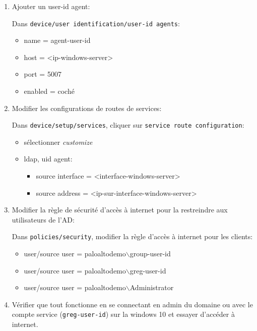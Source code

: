 \documentclass[a4paper]{article}
\begin{document}
\begin{enumerate}
    \item Ajouter un user-id agent:
    \begin{example}
        Dans \texttt{device/user identification/user-id agents}:
        \begin{itemize}
            \item name = agent-user-id
            \item host = <ip-windows-server>
            \item port = 5007
            \item enabled = coché
        \end{itemize}
    \end{example}
    \item Modifier les configurations de routes de services:
    \begin{example}
        Dans \texttt{device/setup/services}, cliquer sur \texttt{service route configuration}:
        \begin{itemize}
            \item sélectionner \textit{customize}
            \item ldap, uid agent:
            \begin{itemize}
                \item source interface = <interface-windows-server>
                \item source address = <ip-sur-interface-windows-server>
            \end{itemize}
        \end{itemize}
    \end{example}
    \item Modifier la règle de sécurité d'accès à internet pour la restreindre aux utilisateurs de l'AD:
    \begin{example}
        Dans \texttt{policies/security}, modifier la règle d'accès à internet pour les clients:
        \begin{itemize}
            \item user/source user = paloaltodemo$\backslash$group-user-id
            \item user/source user = paloaltodemo$\backslash$greg-user-id
            \item user/source user = paloaltodemo$\backslash$Administrator
        \end{itemize}
    \end{example}
    \item Vérifier que tout fonctionne en se connectant en admin du domaine ou avec le compte service (\texttt{greg-user-id}) sur la windows 10 et essayer d'accéder à internet.
\end{enumerate}
\end{document}
